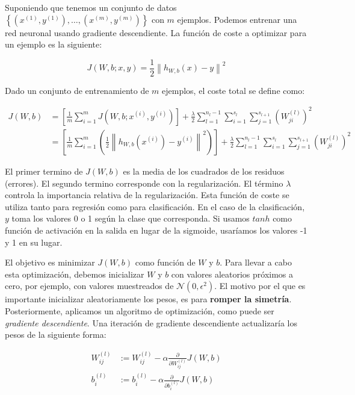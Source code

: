 \documentclass[
  12pt,
  a4paperpaper,
]{report}
\begin{document}
Suponiendo que tenemos un conjunto de datos
\(\left\{\left(x^{(1)}, y^{(1)}\right), \ldots,\left(x^{(m)}, y^{(m)}\right)\right\}\)
con \(m\) ejemplos. Podemos entrenar una red neuronal usando gradiente
descendiente. La función de coste a optimizar para un ejemplo es la
siguiente:

\[J(W, b ; x, y)=\frac{1}{2}\left\|h_{W, b}(x)-y\right\|^{2}\]

Dado un conjunto de entrenamiento de \(m\) ejemplos, el coste total se
define como:

\[
\begin{aligned}
J(W, b) &=\left[\frac{1}{m} \sum_{i=1}^{m} J\left(W, b ; x^{(i)}, y^{(i)}\right)\right]+\frac{\lambda}{2} \sum_{l=1}^{n_{l}-1} \sum_{i=1}^{s_{l}} \sum_{j=1}^{s_{l+1}}\left(W_{j i}^{(l)}\right)^{2} \\
&=\left[\frac{1}{m} \sum_{i=1}^{m}\left(\frac{1}{2}\left\|h_{W, b}\left(x^{(i)}\right)-y^{(i)}\right\|^{2}\right)\right]+\frac{\lambda}{2} \sum_{l=1}^{n_{l}-1} \sum_{i=1}^{s_{l}} \sum_{j=1}^{s_{l+1}}\left(W_{j i}^{(l)}\right)^{2}
\end{aligned}
\]

El primer termino de \(J(W, b)\) es la media de los cuadrados de los
residuos (errores). El segundo termino corresponde con la
regularización. El término \(\lambda\) controla la importancia relativa
de la regularización. Esta función de coste se utiliza tanto para
regresión como para clasificación. En el caso de la clasificación, \(y\)
toma los valores 0 o 1 según la clase que corresponda. Si usamos
\(tanh\) como función de activación en la salida en lugar de la
sigmoide, usaríamos los valores -1 y 1 en su lugar.

El objetivo es minimizar \(J(W, b)\) como función de \(W\) y \(b\). Para
llevar a cabo esta optimización, debemos inicializar \(W\) y \(b\) con
valores aleatorios próximos a cero, por ejemplo, con valores muestreados
de \(\mathcal{N}\left(0, \epsilon^{2}\right)\). El motivo por el que es
importante inicializar aleatoriamente los pesos, es para \textbf{romper
la simetría}. Posteriormente, aplicamos un algoritmo de optimización,
como puede ser \emph{gradiente descendiente}. Una iteración de gradiente
descendiente actualizaría los pesos de la siguiente forma:

\[
\begin{aligned}
W_{i j}^{(l)} &:=W_{i j}^{(l)}-\alpha \frac{\partial}{\partial W_{i j}^{(l)}} J(W, b) \\
b_{i}^{(l)} &:=b_{i}^{(l)}-\alpha \frac{\partial}{\partial b_{i}^{(l)}} J(W, b)
\end{aligned}
\]
\end{document}
